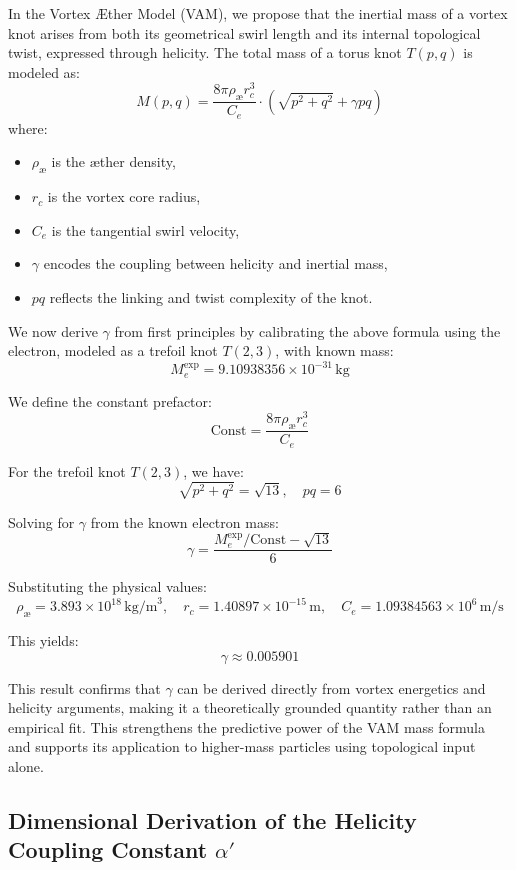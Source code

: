 \documentclass[a4paper, aps,preprint,superscriptaddress, 12pt]{revtex4}
\begin{document}
In the Vortex \AE{}ther Model (VAM), we propose that the inertial mass of a vortex knot arises from both its geometrical swirl length and its internal topological twist, expressed through helicity. The total mass of a torus knot \( T(p,q) \) is modeled as:
\[
    M(p,q) = \frac{8\pi \rho_\text{\ae} r_c^3}{C_e} \cdot \left( \sqrt{p^2 + q^2} + \gamma pq \right)
\]
where:
\begin{itemize}
    \item \( \rho_\text{\ae} \) is the æther density,
    \item \( r_c \) is the vortex core radius,
    \item \( C_e \) is the tangential swirl velocity,
    \item \( \gamma \) encodes the coupling between helicity and inertial mass,
    \item \( pq \) reflects the linking and twist complexity of the knot.
\end{itemize}

We now derive \( \gamma \) from first principles by calibrating the above formula using the electron, modeled as a trefoil knot \( T(2,3) \), with known mass:
\[
    M_e^{\text{exp}} = 9.10938356 \times 10^{-31} \, \text{kg}
\]

We define the constant prefactor:
\[
    \text{Const} = \frac{8\pi \rho_\text{\ae} r_c^3}{C_e}
\]

For the trefoil knot \( T(2,3) \), we have:
\[
    \sqrt{p^2 + q^2} = \sqrt{13}, \quad pq = 6
\]

Solving for \( \gamma \) from the known electron mass:
\[
    \gamma = \frac{M_e^{\text{exp}} / \text{Const} - \sqrt{13}}{6}
\]

Substituting the physical values:
\[
    \rho_\text{\ae} = 3.893 \times 10^{18} \, \text{kg/m}^3, \quad
    r_c = 1.40897 \times 10^{-15} \, \text{m}, \quad
    C_e = 1.09384563 \times 10^6 \, \text{m/s}
\]

This yields:
\[
    \boxed{\gamma \approx 0.005901}
\]

This result confirms that \( \gamma \) can be derived directly from vortex energetics and helicity arguments, making it a theoretically grounded quantity rather than an empirical fit. This strengthens the predictive power of the VAM mass formula and supports its application to higher-mass particles using topological input alone.

\subsection*{Dimensional Derivation of the Helicity Coupling Constant \( \alpha' \)}
\end{document}
